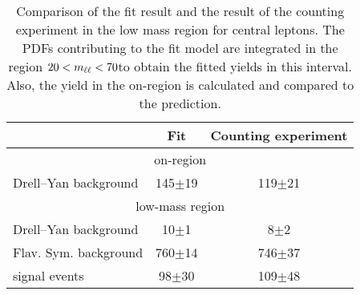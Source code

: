 
\begin{table}[hbtp]
 \renewcommand{\arraystretch}{1.3}
 \setlength{\belowcaptionskip}{6pt}
 \centering
 \caption{Comparison of the fit result and the result of the counting experiment in the low mass region for central leptons. The PDFs contributing to the fit model are integrated in the region $20 < m_{\ell\ell} < 70$\GeV to obtain the fitted yields in this interval. Also, the yield in the on-\Z region is calculated and compared to the prediction. 
     }
  \label{tab:fitResultLowMass}
  \begin{tabular}{l| cc }
    \hline
    \hline
                                &  Fit        & Counting experiment \\ 

    \hline
    \multicolumn{3}{c}{on-\Z region} \\ 

    \hline
        Drell--Yan background       &  145$\pm$19                   & 119$\pm$21  \\

\hline
    \multicolumn{3}{c}{low-mass region} \\ 

    \hline
        Drell--Yan background       &  10$\pm$1                   & 8$\pm$2  \\
        Flav. Sym. background       &  760$\pm$14                   & 746$\pm$37  \\
        signal events       &  98$\pm$30                   & 109$\pm$48  \\

    \hline
    \hline    
  \end{tabular}
\end{table}


